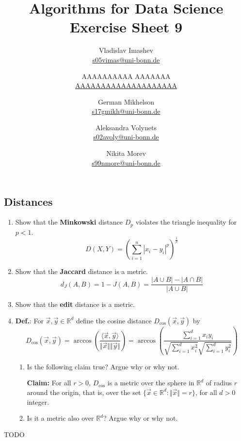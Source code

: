 \documentclass{article}
\title{Algorithms for Data Science \\ Exercise Sheet 9}
\author{
  Vladislav Imashev \\ \href{mailto:s05vimas@uni-bonn.de}{s05vimas@uni-bonn.de} \and
  AAAAAAAAAA AAAAAAA \\ \href{mailto:AAAAAAAAAAAAAAAAAAAA}{AAAAAAAAAAAAAAAAAAAA} \and
  German Mikhelson \\ \href{mailto:s17gmikh@uni-bonn.de}{s17gmikh@uni-bonn.de} \and
  Aleksandra Volynets \\ \href{mailto:s02avoly@uni-bonn.de}{s02avoly@uni-bonn.de} \and
  Nikita Morev \\ \href{mailto:s99nmore@uni-bonn.de}{s99nmore@uni-bonn.de}
}
\newcommand{\R}{\mathbb{R}}
\begin{document}
  \maketitle

  \setcounter{section}{9}
  \subsection{Distances}
  \begin{centerframebox}
    \begin{enumerate}[label=(\roman*)]
      \item Show that the \textbf{Minkowski} distance $D_p$ violates the triangle inequality for $p < 1$.
      \[ D\left(X,Y\right) = \left(\sum_{i=1}^n |x_i-y_i|^p\right)^{\frac{1}{p}} \]
      \item Show that the \textbf{Jaccard} distance is a metric.
      \[ d_J(A,B) = 1 - J(A,B) = \frac{|A \cup B| - |A \cap B|}{|A \cup B|} \]
      \item Show that the \textbf{edit} distance is a metric.

      \item \textbf{Def.}: For $\vec{x},\vec{y}\in \R^d$ define the cosine distance
      $D_{\cos}(\vec{x}, \vec{y})$ by
      \[ D_{\cos}(\vec{x},\vec{y}) =
      \arccos\left(\frac{\langle\vec{x},\vec{y}\rangle}{\Vert{\vec{x}}\Vert\Vert{\vec{y}}\Vert}\right) =
      \arccos\left(\frac{\sum_{i=1}^{d}x_{i}y_{i}}{\sqrt{\sum_{i=1}^{d}x_{i}^{2}}\sqrt{\sum_{i=1}^{d}y_{i}^{2}}}\right) \]

      \begin{enumerate}
        \item  Is the following claim true? Argue why or why not.

        \textbf{Claim:} For all $r > 0$, $D_{\cos}$ is a metric over the sphere in $\R^d$ of radius $r$ around the origin,
        that is, over the set $\{\vec{x} \in \R^d : \Vert\vec{x}\Vert = r \}$,
        for all $d > 0$ integer.
        \item Is it a metric also over $\R^d$? Argue why or why not.
      \end{enumerate}
    \end{enumerate}
  \end{centerframebox}
  TODO %
\end{document}
